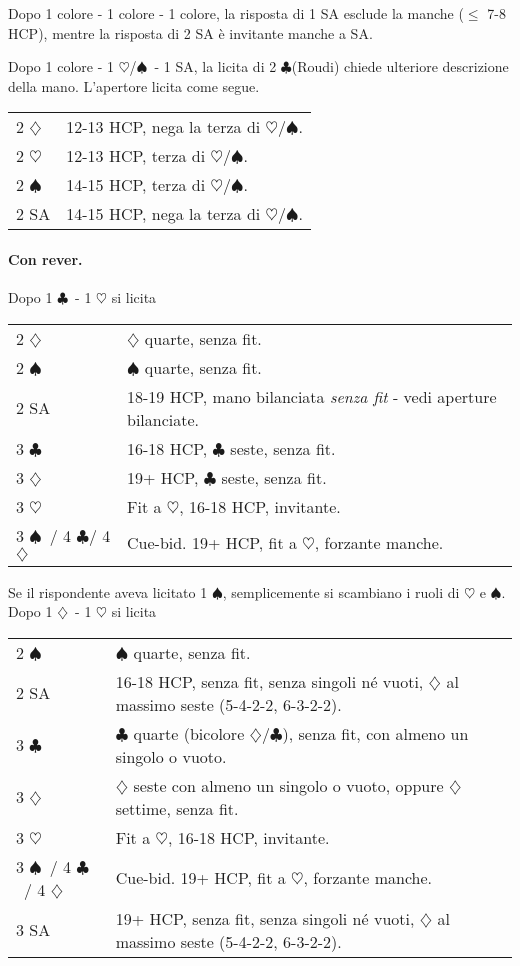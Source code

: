 \documentclass[a4paper,10pt]{article}
\renewcommand{\c}{$\clubsuit$\xspace}
\renewcommand{\d}{$\diamondsuit$\xspace}
\newcommand{\h}{$\heartsuit$\xspace}
\newcommand{\s}{$\spadesuit$\xspace}
\newcommand{\sa}{SA\xspace}
\newcommand{\smallspace}{\vskip0.3cm}
\newenvironment{twocol}
  {\smallspace\noindent\begin{tabular}{l p{0.78\textwidth}}}
  {\end{tabular}\smallspace}
\begin{document}
Dopo 1 colore - 1 colore - 1 colore, la risposta di 1 \sa esclude la manche ($\leq$ 7-8 HCP), mentre la risposta di 2 \sa è invitante manche a \sa.

Dopo 1 colore - 1 \h/\s\ - 1 \sa, la licita di 2 \c (Roudi) chiede ulteriore descrizione della mano. L'apertore licita come segue.
\begin{twocol}
	2 \d & 12-13 HCP, nega la terza di \h/\s.\\
	2 \h & 12-13 HCP, terza di \h/\s.\\
	2 \s & 14-15 HCP, terza di \h/\s.\\
	2 \sa & 14-15 HCP, nega la terza di \h/\s.
\end{twocol}


\paragraph{Con rever.} Dopo 1 \c\ - 1 \h si licita
\begin{twocol}
	2 \d & \d quarte, senza fit.\\
	2 \s & \s quarte, senza fit.\\
	2 \sa & 18-19 HCP, mano bilanciata \emph{senza fit} - vedi aperture bilanciate.\\
	3 \c & 16-18 HCP, \c seste, senza fit.\\
	3 \d & 19+ HCP, \c seste, senza fit.\\
	3 \h & Fit a \h, 16-18 HCP, invitante.\\
	3 \s\ / 4 \c / 4 \d & Cue-bid. 19+ HCP, fit a \h, forzante manche.\\
\end{twocol}

\noindent Se il rispondente aveva licitato 1 \s, semplicemente si scambiano i ruoli di \h e \s.
\smallspace
\noindent Dopo 1 \d\ - 1 \h si licita
\begin{twocol}
	2 \s & \s quarte, senza fit.\\
	2 \sa & 16-18 HCP, senza fit, senza singoli né vuoti, \d al massimo seste (5-4-2-2, 6-3-2-2).\\
	3 \c & \c quarte (bicolore \d/\c), senza fit, con almeno un singolo o vuoto.\\
	3 \d & \d seste con almeno un singolo o vuoto, oppure \d settime, senza fit.\\
	3 \h & Fit a \h, 16-18 HCP, invitante.\\
	3 \s\ / 4 \c\ / 4 \d & Cue-bid. 19+ HCP, fit a \h, forzante manche.\\
	3 \sa & 19+ HCP, senza fit, senza singoli né vuoti, \d al massimo seste (5-4-2-2, 6-3-2-2).
\end{twocol}
\end{document}
